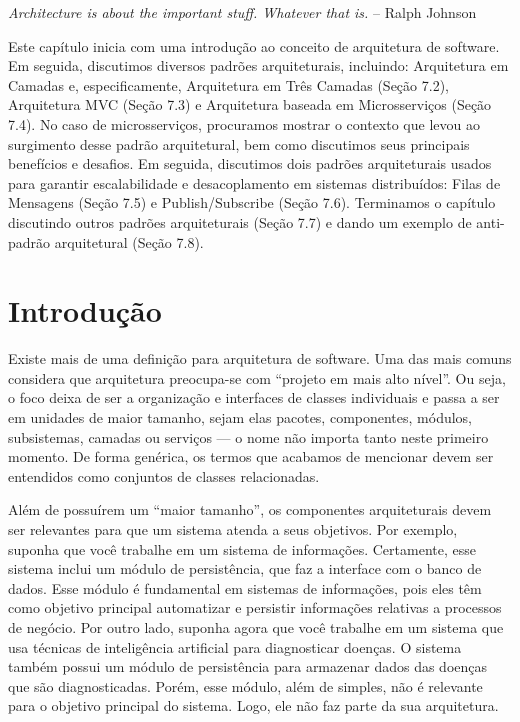 \documentclass[
  11pt,
  twoside]{book}
\renewenvironment{quote}{\centering \vspace{1.5ex} \begin{tcolorbox}[colback=backcolor, width=4.9in]}{\end{tcolorbox}}
\begin{document}
\begin{quote}
\emph{Architecture is about the important stuff. Whatever that is.} --
Ralph Johnson
\end{quote}

Este capítulo inicia com uma introdução ao conceito de arquitetura de
software. Em seguida, discutimos diversos padrões arquiteturais,
incluindo: Arquitetura em Camadas e, especificamente, Arquitetura em
Três Camadas (Seção 7.2), Arquitetura MVC (Seção 7.3) e Arquitetura
baseada em Microsserviços (Seção 7.4). No caso de microsserviços,
procuramos mostrar o contexto que levou ao surgimento desse padrão
arquitetural, bem como discutimos seus principais benefícios e desafios.
Em seguida, discutimos dois padrões arquiteturais usados para garantir
escalabilidade e desacoplamento em sistemas distribuídos: Filas de
Mensagens (Seção 7.5) e Publish/Subscribe (Seção 7.6). Terminamos o
capítulo discutindo outros padrões arquiteturais (Seção 7.7) e dando um
exemplo de anti-padrão arquitetural (Seção 7.8).

\hypertarget{introduuxe7uxe3o-4}{%
\section{Introdução}\label{introduuxe7uxe3o-4}}

 Existe mais de uma definição para
arquitetura de software. Uma das mais comuns considera que arquitetura
preocupa-se com ``projeto em mais alto nível''. Ou seja, o foco deixa de
ser a organização e interfaces de classes individuais e passa a ser em
unidades de maior tamanho, sejam elas pacotes, componentes, módulos,
subsistemas, camadas ou serviços --- o nome não importa tanto neste
primeiro momento. De forma genérica, os termos que acabamos de mencionar
devem ser entendidos como conjuntos de classes relacionadas.

Além de possuírem um ``maior tamanho'', os componentes arquiteturais
devem ser relevantes para que um sistema atenda a seus objetivos. Por
exemplo, suponha que você trabalhe em um sistema de informações.
Certamente, esse sistema inclui um módulo de persistência, que faz a
interface com o banco de dados. Esse módulo é fundamental em sistemas de
informações, pois eles têm como objetivo principal automatizar e
persistir informações relativas a processos de negócio. Por outro lado,
suponha agora que você trabalhe em um sistema que usa técnicas de
inteligência artificial para diagnosticar doenças. O sistema também
possui um módulo de persistência para armazenar dados das doenças que
são diagnosticadas. Porém, esse módulo, além de simples, não é relevante
para o objetivo principal do sistema. Logo, ele não faz parte da sua
arquitetura.
\end{document}
